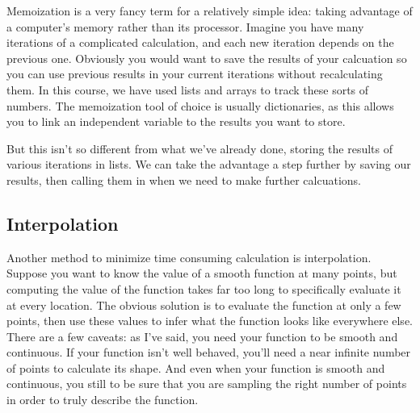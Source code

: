 \documentclass[a4paper,12pt]{article}
\begin{document}
Memoization is a very fancy term for a relatively simple idea: taking advantage of a computer's memory rather than its processor. Imagine you have many iterations of a complicated calculation, and each new iteration depends on the previous one. Obviously you would want to save the results of your calcuation so you can use previous results in your current iterations without recalculating them. In this course, we have used lists and arrays to track these sorts of numbers. The memoization tool of choice is usually dictionaries, as this allows you to link an independent variable to the results you want to store.

But this isn't so different from what we've already done, storing the results of various iterations in lists. We can take the advantage a step further by saving our results, then calling them in when we need to make further calcuations.

\subsection{Interpolation}

Another method to minimize time consuming calculation is interpolation. Suppose you want to know the value of a smooth function at many points, but computing the value of the function takes far too long to specifically evaluate it at every location. The obvious solution is to evaluate the function at only a few points, then use these values to infer what the function looks like everywhere else. There are a few caveats: as I've said, you need your function to be smooth and continuous. If your function isn't well behaved, you'll need a near infinite number of points to calculate its shape. And even when your function is smooth and continuous, you still to be sure that you are sampling the right number of points in order to truly describe the function.
\end{document}
